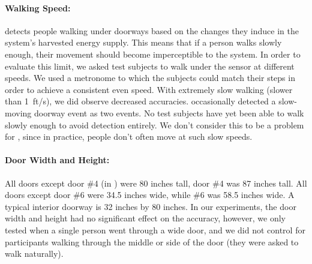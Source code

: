 \paragraph{Walking Speed:}
\sysname detects people walking under doorways based on the changes they induce in the system's harvested energy supply.
This means that if a person walks slowly enough, their movement should become imperceptible to the system.
In order to evaluate this limit, we asked test subjects to walk under the sensor at different speeds.
We used a metronome to which the subjects could match their steps in order to achieve a consistent even speed.
With extremely slow walking (slower than 1~ft/s), we did observe decreased accuracies.
\sysname occasionally detected a slow-moving doorway event as two events.
No test subjects have yet been able to walk slowly enough to avoid detection entirely.
We don't consider this to be a problem for \sysname, since in practice, people don't often move at such slow speeds.

\paragraph{Door Width and Height:}
All doors except door \#4 (in ) were 80 inches tall, door \#4 was 87 inches tall. 
All doors except door \#6 were 34.5 inches wide, while \#6 was 58.5 inches wide.
A typical interior doorway is 32 inches by 80 inches.
In our experiments, the door width and height had no significant effect on the accuracy, however, we only tested when a single person went through a wide door, and we did not control for participants walking through the middle or side of the door (they were asked to walk naturally).


